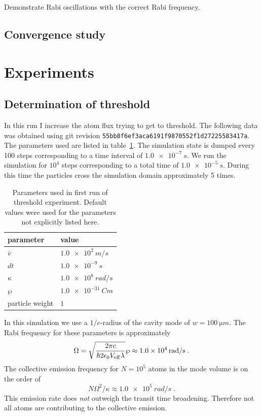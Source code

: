 \documentclass[aps, superscriptaddress, groupedaddress, preprint]{revtex4}
\newcommand\gitrevision[1]{{\tt #1}}
\begin{document}
Demonstrate Rabi oscillations with the correct Rabi frequency.


\subsection{Convergence study}


\section{Experiments}


\subsection{Determination of threshold}

In this run I increase the atom flux trying to get to threshold.
The following data was obtained using git revision
\gitrevision{55bb8f6ef3aca6191f9870552f1d27225583417a}.  The
parameters used are listed in table~\ref{tab:Run1Params}.  The
simulation state is dumped every 100 steps corresponding to a
time interval of $\SI{1.0e-7}{s}$.  We run the simulation for
$10^4$ steps corresponding to a total time of $\SI{1.0e-5}{s}$.
During this time the particles cross the simulation domain
approximately 5 times.

\begin{table}
  \begin{tabular}{|l|l|}
    \hline
    parameter       & value\\
    \hline
    \hline
    $\bar v$        & $\SI{1.0e2}{m/s}$\\
    \hline
    $dt$            & $\SI{1.0e-9}{s}$\\
    \hline
    $\kappa$        & $\SI{1.0e8}{rad/s}$\\
    \hline
    $\wp$           & $\SI{1.0e-31}{Cm}$\\
    \hline
    particle weight & $1$\\
    \hline
  \end{tabular}
  \caption{Parameters used in first run of threshold experiment.
    Default values were used for the parameters not explicitly
    listed here.}
  \label{tab:Run1Params}
\end{table}

In this simulation we use a $1/e$-radius of the cavity mode of $w=\SI{100}{\micro m}$.  The Rabi frequency for these parameters is approximately
\begin{equation}
  \Omega =
  \sqrt{\frac{2\pi c}{\hbar 2 \epsilon_0 V_{\rm eff}\lambda}} \wp \approx
  \SI{1.0e4}{rad/s}\;.
\end{equation}
The collective emission frequency for $N=10^5$ atoms in the mode
volume is on the order of
\begin{equation}
  N\Omega^2/\kappa \approx \SI{1.0e5}{rad/s}\;.
\end{equation}
This emission rate does \emph{not} outweigh the transit time
broadening.  Therefore not all atoms are contributing to the
collective emission.
\end{document}
